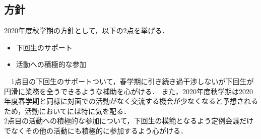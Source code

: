 \subsection*{\newGradeIfKouki{}\thirdGrade{}方針}


2020年度秋学期の\thirdGrade{}方針として，以下の2点を挙げる．
\begin{itemize}
  \item 下回生のサポート
  \item 活動への積極的な参加
\end{itemize}
　1点目の下回生のサポートついて，春学期に引き続き過干渉しないが下回生が円滑に業務を全うできるような補助を心がける．
また，2020年度秋学期は2020年度春学期と同様に対面での活動がなく交流する機会が少なくなると予想されるため，活動において\firstGrade{}には特に気を配る．\\
2点目の活動への積極的な参加について，下回生の模範となるよう定例会議だけでなくその他の活動にも積極的に参加するよう心がける．\\